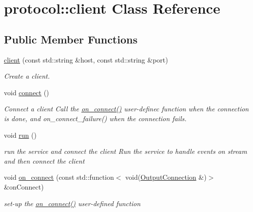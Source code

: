 \hypertarget{classprotocol_1_1client}{}\section{protocol\+:\+:client Class Reference}
\label{classprotocol_1_1client}
\subsection*{Public Member Functions}
\begin{DoxyCompactItemize}
\item 
\hyperlink{classprotocol_1_1client_a99df180b6792cb587ccace4d9d454842}{client} (const std\+::string \&host, const std\+::string \&port)
\begin{DoxyCompactList}\small\item\em Create a client. \end{DoxyCompactList}\item 
\mbox{\label{classprotocol_1_1client_af482c1be4d9560024803bec8dc857804}} 
void \hyperlink{classprotocol_1_1client_af482c1be4d9560024803bec8dc857804}{connect} ()
\begin{DoxyCompactList}\small\item\em Connect a client Call the \hyperlink{classprotocol_1_1client_a0178fdb73323150789236de9d97e4d07}{on\+\_\+connect()} user-\/definec function when the connection is done, and on\+\_\+connect\+\_\+failure() when the connection fails. \end{DoxyCompactList}\item 
\mbox{\label{classprotocol_1_1client_a0e296243ddccfa00f13e578510ab9f7e}} 
void \hyperlink{classprotocol_1_1client_a0e296243ddccfa00f13e578510ab9f7e}{run} ()
\begin{DoxyCompactList}\small\item\em run the service and connect the client Run the service to handle events on stream and then connect the client \end{DoxyCompactList}\item 
void \hyperlink{classprotocol_1_1client_a0178fdb73323150789236de9d97e4d07}{on\+\_\+connect} (const std\+::function$<$ void(\hyperlink{classprotocol_1_1_output_connection}{Output\+Connection} \&)$>$ \&on\+Connect)
\begin{DoxyCompactList}\small\item\em set-\/up the \hyperlink{classprotocol_1_1client_a0178fdb73323150789236de9d97e4d07}{on\+\_\+connect()} user-\/defined function \end{DoxyCompactList}\item 

\end{DoxyCompactItemize}
